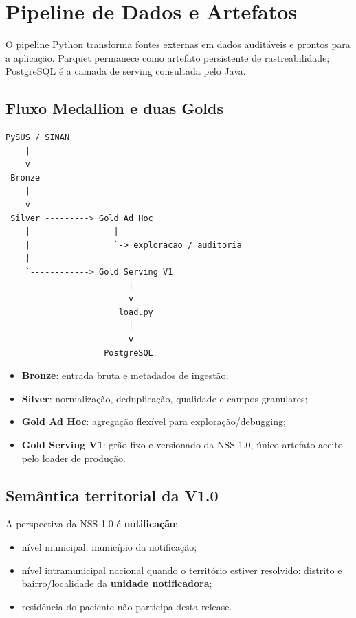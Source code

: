 \section{Pipeline de Dados e Artefatos}

O pipeline Python transforma fontes externas em dados auditáveis e prontos para a aplicação. Parquet permanece como artefato persistente de rastreabilidade; PostgreSQL é a camada de serving consultada pelo Java.

\subsection{Fluxo Medallion e duas Golds}

\begin{lstlisting}
PySUS / SINAN
    |
    v
 Bronze
    |
    v
 Silver ---------> Gold Ad Hoc
    |                 |
    |                 `-> exploracao / auditoria
    |
    `------------> Gold Serving V1
                         |
                         v
                       load.py
                         |
                         v
                    PostgreSQL
\end{lstlisting}

\begin{itemize}
    \item \textbf{Bronze}: entrada bruta e metadados de ingestão;
    \item \textbf{Silver}: normalização, deduplicação, qualidade e campos granulares;
    \item \textbf{Gold Ad Hoc}: agregação flexível para exploração/debugging;
    \item \textbf{Gold Serving V1}: grão fixo e versionado da NSS 1.0, único artefato aceito pelo loader de produção.
\end{itemize}

\subsection{Semântica territorial da V1.0}

A perspectiva da NSS 1.0 é \textbf{notificação}:

\begin{itemize}
    \item nível municipal: município da notificação;
    \item nível intramunicipal nacional quando o território estiver resolvido: distrito e bairro/localidade da \textbf{unidade notificadora};
    \item residência do paciente não participa desta release.
\end{itemize}


